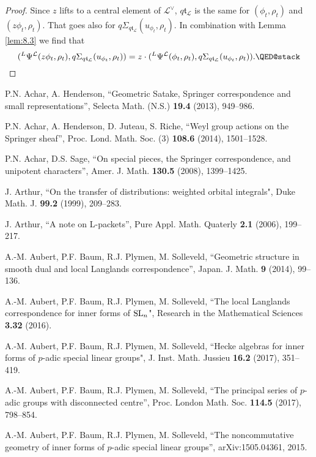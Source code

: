 \documentclass[11pt]{amsart}
\theoremstyle{definition}
\def\SL{{\rm SL}}
\def\cL{{\mathcal L}}
\def\ft{{\mathfrak t}}
\begin{document}
\begin{proof}
Since $z$ lifts to a central element of $\cL^\vee$, $q \ft_\cL$ is the same for
$(\phi_t,\rho_t)$ and $(z \phi_t,\rho_t)$. That goes also for 
$q \Sigma_{q \ft_\cL}(u_{\phi_t},\rho_t)$. In combination with Lemma \ref{lem:8.3}
we find that 
\[
({}^L \Psi^\cL (z \phi_t,\rho_t), q \Sigma_{q \ft_\cL}(u_{\phi_t},\rho_t)) =
z \cdot ({}^L \Psi^\cL (\phi_t,\rho_t), q \Sigma_{q \ft_\cL}(u_{\phi_t},\rho_t)) . \qedhere
\]
\end{proof}


\begin{thebibliography}{99}

 P.N. Achar, A. Henderson,
``Geometric Satake, Springer correspondence and small representations'',
Selecta Math. (N.S.) {\bf 19.4} (2013), 949--986. 

 P.N. Achar, A. Henderson, D. Juteau, S. Riche,
``Weyl group actions on the Springer sheaf'',
Proc. Lond. Math. Soc. (3) {\bf 108.6} (2014), 1501--1528.

 P.N. Achar, D.S. Sage,
``On special pieces, the Springer correspondence, and unipotent characters'',
Amer. J. Math. {\bf 130.5} (2008), 1399--1425.

 J. Arthur, 
``On the transfer of distributions: weighted orbital integrals", 
Duke Math. J. {\bf 99.2} (1999), 209--283.

 J. Arthur, 
``A note on L-packets'',
Pure Appl. Math. Quaterly {\bf 2.1} (2006), 199--217.

 A.-M. Aubert, P.F. Baum, R.J. Plymen, M. Solleveld,
``Geometric structure in smooth dual and local Langlands correspondence'',
Japan. J. Math. {\bf 9} (2014), 99--136.

 A.-M. Aubert, P.F. Baum, R.J. Plymen, M. Solleveld,
``The local Langlands correspondence for inner forms of $\SL_n$",
Research in the Mathematical Sciences {\bf 3.32} (2016).

 A.-M. Aubert, P.F. Baum, R.J. Plymen, M. Solleveld,
``Hecke algebras for inner forms of $p$-adic special linear groups",
J. Inst. Math. Jussieu {\bf 16.2} (2017), 351--419.

 A.-M. Aubert, P.F. Baum, R.J. Plymen, M. Solleveld,
``The principal series of $p$-adic groups with disconnected centre'',
Proc. London Math. Soc. {\bf 114.5} (2017), 798--854.

 A.-M. Aubert, P.F. Baum, R.J. Plymen, M. Solleveld,
``The noncommutative geometry of inner forms of $p$-adic special linear groups'',
arXiv:1505.04361, 2015.


\end{thebibliography}
\end{document}
